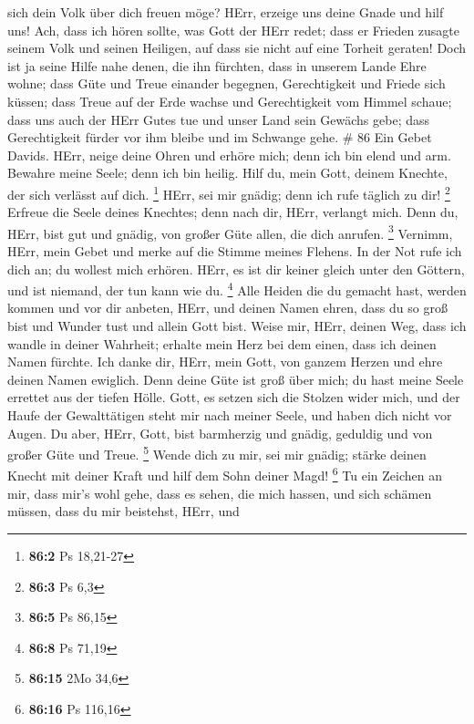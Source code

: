 sich dein Volk über dich freuen möge?  HErr, erzeige uns
deine Gnade und hilf uns!  Ach, dass ich hören sollte, was
Gott der HErr redet; dass er Frieden zusagte seinem Volk und seinen
Heiligen, auf dass sie nicht auf eine Torheit geraten! 
Doch ist ja seine Hilfe nahe denen, die ihn fürchten, dass in unserem
Lande Ehre wohne;  dass Güte und Treue einander begegnen,
Gerechtigkeit und Friede sich küssen;  dass Treue auf der
Erde wachse und Gerechtigkeit vom Himmel schaue;  dass uns
auch der HErr Gutes tue und unser Land sein Gewächs gebe; 
dass Gerechtigkeit fürder vor ihm bleibe und im Schwange gehe. \# 86
 Ein Gebet Davids. HErr, neige deine Ohren und erhöre mich;
denn ich bin elend und arm.  Bewahre meine Seele; denn ich
bin heilig. Hilf du, mein Gott, deinem Knechte, der sich verlässt auf
dich. \footnote{\textbf{86:2} Ps 18,21-27}  HErr, sei mir
gnädig; denn ich rufe täglich zu dir! \footnote{\textbf{86:3} Ps 6,3}
 Erfreue die Seele deines Knechtes; denn nach dir, HErr,
verlangt mich.  Denn du, HErr, bist gut und gnädig, von
großer Güte allen, die dich anrufen. \footnote{\textbf{86:5} Ps 86,15}
 Vernimm, HErr, mein Gebet und merke auf die Stimme meines
Flehens.  In der Not rufe ich dich an; du wollest mich
erhören.  HErr, es ist dir keiner gleich unter den Göttern,
und ist niemand, der tun kann wie du. \footnote{\textbf{86:8} Ps 71,19}
 Alle Heiden die du gemacht hast, werden kommen und vor dir
anbeten, HErr, und deinen Namen ehren,  dass du so groß
bist und Wunder tust und allein Gott bist.  Weise mir,
HErr, deinen Weg, dass ich wandle in deiner Wahrheit; erhalte mein Herz
bei dem einen, dass ich deinen Namen fürchte.  Ich danke
dir, HErr, mein Gott, von ganzem Herzen und ehre deinen Namen ewiglich.
 Denn deine Güte ist groß über mich; du hast meine Seele
errettet aus der tiefen Hölle.  Gott, es setzen sich die
Stolzen wider mich, und der Haufe der Gewalttätigen steht mir nach
meiner Seele, und haben dich nicht vor Augen.  Du aber,
HErr, Gott, bist barmherzig und gnädig, geduldig und von großer Güte und
Treue. \footnote{\textbf{86:15} 2Mo 34,6}  Wende dich zu
mir, sei mir gnädig; stärke deinen Knecht mit deiner Kraft und hilf dem
Sohn deiner Magd! \footnote{\textbf{86:16} Ps 116,16}  Tu
ein Zeichen an mir, dass mir's wohl gehe, dass es sehen, die mich
hassen, und sich schämen müssen, dass du mir beistehst, HErr, und
